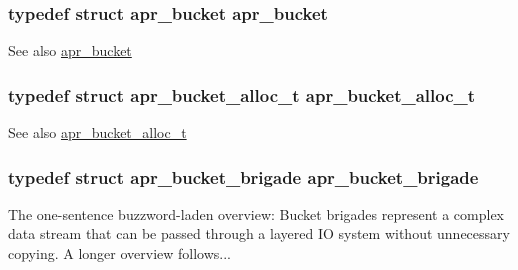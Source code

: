 \subsubsection[{\texorpdfstring{apr\+\_\+bucket}{apr_bucket}}]{\setlength{\rightskip}{0pt plus 5cm}typedef struct {\bf apr\+\_\+bucket} {\bf apr\+\_\+bucket}}\hypertarget{group__APR__Util__Bucket__Brigades_gaa17a456120961b1c5af0525f4900a457}{}\label{group__APR__Util__Bucket__Brigades_gaa17a456120961b1c5af0525f4900a457}
\begin{DoxySeeAlso}{See also}
\hyperlink{structapr__bucket}{apr\+\_\+bucket} 
\end{DoxySeeAlso}
\subsubsection[{\texorpdfstring{apr\+\_\+bucket\+\_\+alloc\+\_\+t}{apr_bucket_alloc_t}}]{\setlength{\rightskip}{0pt plus 5cm}typedef struct {\bf apr\+\_\+bucket\+\_\+alloc\+\_\+t} {\bf apr\+\_\+bucket\+\_\+alloc\+\_\+t}}\hypertarget{group__APR__Util__Bucket__Brigades_ga9a30babfeb6e290db124d8f9b69e49e4}{}\label{group__APR__Util__Bucket__Brigades_ga9a30babfeb6e290db124d8f9b69e49e4}
\begin{DoxySeeAlso}{See also}
\hyperlink{structapr__bucket__alloc__t}{apr\+\_\+bucket\+\_\+alloc\+\_\+t} 
\end{DoxySeeAlso}
\subsubsection[{\texorpdfstring{apr\+\_\+bucket\+\_\+brigade}{apr_bucket_brigade}}]{\setlength{\rightskip}{0pt plus 5cm}typedef struct {\bf apr\+\_\+bucket\+\_\+brigade} {\bf apr\+\_\+bucket\+\_\+brigade}}\hypertarget{group__APR__Util__Bucket__Brigades_ga9f50254e85c7aad79ca289a0ba069025}{}\label{group__APR__Util__Bucket__Brigades_ga9f50254e85c7aad79ca289a0ba069025}
The one-\/sentence buzzword-\/laden overview\+: Bucket brigades represent a complex data stream that can be passed through a layered IO system without unnecessary copying. A longer overview follows...

